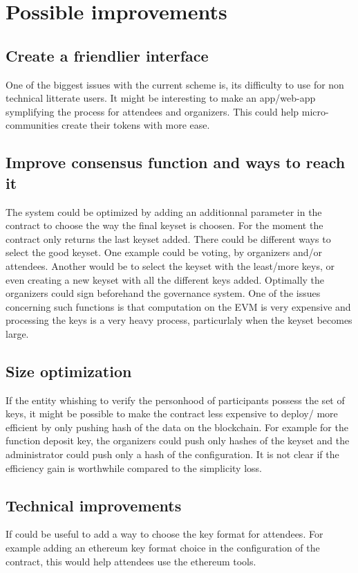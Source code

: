 \documentclass[11pt, a4paper, twoside, openright]{book} %
\begin{document}
\section{Possible improvements}

\subsection{Create a friendlier interface}
One of the biggest issues with the current scheme is, its difficulty to use for non technical litterate users. It might be interesting to make an app/web-app symplifying the process for attendees and organizers. This could help micro-communities create their tokens with more ease.
\subsection{Improve consensus function and ways to reach it}
The system could be optimized by adding an additionnal parameter in the contract to choose the way the final keyset is choosen. For the moment the contract only returns the last keyset added. There could be different ways to select the good keyset. One example could be voting, by organizers and/or attendees. Another would be to select the keyset with the least/more keys, or even creating a new keyset with all the different keys added. Optimally the organizers could sign beforehand the governance system. One of the issues concerning such functions is that computation on the EVM is very expensive and processing the keys is a very heavy process, particurlaly when the keyset becomes large.

\subsection{Size optimization}
If the entity whishing to verify the personhood of participants possess the set of keys, it might be possible to make the contract less expensive to deploy/ more efficient by only pushing hash of the data on the blockchain. For example for the function deposit key, the organizers could push only hashes of the keyset and the administrator could push only a hash of the configuration. It is not clear if the efficiency gain is worthwhile compared to the simplicity loss.

\subsection{Technical improvements}
If could be useful to add a way to choose the key format for attendees. For example adding an ethereum key format choice in the configuration of the contract, this would help attendees use the ethereum tools.
\end{document}
